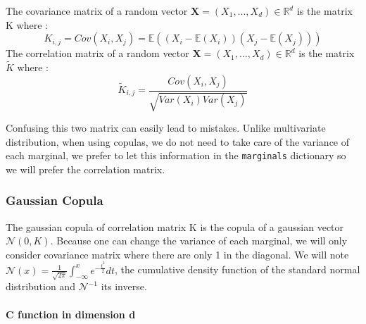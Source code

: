 \documentclass{article}
\begin{document}
   \begin{definition}
   The covariance matrix of a random vector $\mathbf{X} = (X_1,...,X_d) \in \mathbb{R}^d$ is the matrix K where :
   \begin{equation*}
   K_{i,j} = Cov(X_i,X_j) = \mathbb{E}((X_i-\mathbb{E}(X_i))(X_j-\mathbb{E}(X_j)))
   \end{equation*}
   The correlation matrix of a random vector $\mathbf{X} = (X_1,...,X_d) \in \mathbb{R}^d$ is the matrix $\tilde{K}$ where :
   \begin{equation*}
   \tilde{K}_{i,j} = \frac{Cov(X_i,X_j)}{\sqrt{Var(X_i)Var(X_j)}}
   \end{equation*}
   
   \end{definition}
   
   Confusing this two matrix can easily lead to mistakes. Unlike multivariate distribution, when using copulas, we do not need to take care of the variance of each marginal, we prefer to let this information in the \texttt{marginals} dictionary so we will prefer the correlation matrix.
   

	\subsubsection{Gaussian Copula}
	
	The gaussian copula of correlation matrix K is the copula of a gaussian vector \begin{math} \mathcal{N}(0,K) \end{math}.\newline
	\newline
	Because one can change the variance of each marginal, we will only consider covariance matrix where there are only 1 in the diagonal.
	\newline
	\newline
	We will note \begin{math} \mathcal{N}(x)=\frac{1}{\sqrt{2\pi}}\int_{-\infty}^{x} e^{-\frac{t^{2}}{2}}dt \end{math}, the cumulative density function of the standard normal distribution and \begin{math} \mathcal{N}^{-1} \end{math} its inverse.
	
	\paragraph{C function in dimension d}
	
\end{document}
